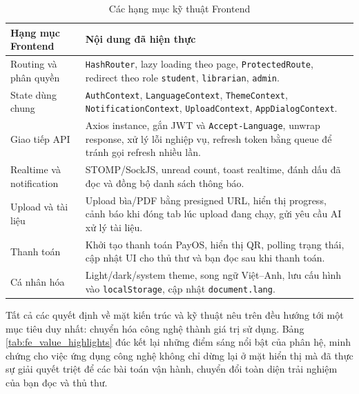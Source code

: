 \begin{table}[H]
\centering
\small
\begin{tabularx}{\textwidth}{|p{3.4cm}|X|}
\hline
\textbf{Hạng mục Frontend} & \textbf{Nội dung đã hiện thực} \\
\hline
Routing và phân quyền &
\texttt{HashRouter}, lazy loading theo page, \texttt{ProtectedRoute}, redirect
theo role \texttt{student}, \texttt{librarian}, \texttt{admin}. \\
\hline
State dùng chung &
\texttt{AuthContext}, \texttt{LanguageContext}, \texttt{ThemeContext},
\texttt{NotificationContext}, \texttt{UploadContext}, \texttt{AppDialogContext}. \\
\hline
Giao tiếp API &
Axios instance, gắn JWT và \texttt{Accept-Language}, unwrap response, xử lý lỗi
nghiệp vụ, refresh token bằng queue để tránh gọi refresh nhiều lần. \\
\hline
Realtime và notification &
STOMP/SockJS, unread count, toast realtime, đánh dấu đã đọc và đồng bộ danh sách
thông báo. \\
\hline
Upload và tài liệu &
Upload bìa/PDF bằng presigned URL, hiển thị progress, cảnh báo khi đóng tab lúc
upload đang chạy, gửi yêu cầu AI xử lý tài liệu. \\
\hline
Thanh toán &
Khởi tạo thanh toán PayOS, hiển thị QR, polling trạng thái, cập nhật UI cho thủ
thư và bạn đọc sau khi thanh toán. \\
\hline
Cá nhân hóa &
Light/dark/system theme, song ngữ Việt--Anh, lưu cấu hình vào
\texttt{localStorage}, cập nhật \texttt{document.lang}. \\
\hline
\end{tabularx}
\caption{Các hạng mục kỹ thuật Frontend}
\label{tab:fe_technical_summary}
\end{table}

Tất cả các quyết định về mặt kiến trúc và kỹ thuật nêu trên đều hướng tới một mục tiêu duy nhất: chuyển hóa công nghệ thành giá trị sử dụng. Bảng \ref{tab:fe_value_highlights} đúc kết lại những điểm sáng nổi bật của phân hệ, minh chứng cho việc ứng dụng công nghệ không chỉ dừng lại ở mặt hiển thị mà đã thực sự giải quyết triệt để các bài toán vận hành, chuyển đổi toàn diện trải nghiệm của bạn đọc và thủ thư.


